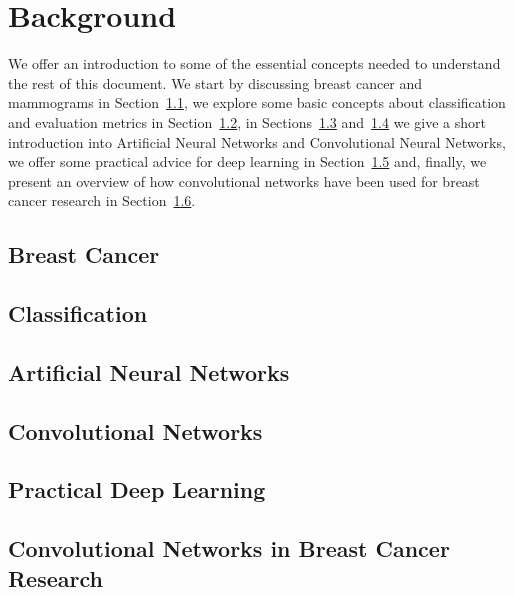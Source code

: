 \chapter{Background}
\label{ch:Background}
We offer an introduction to some of the essential concepts needed to understand the rest of this document. We start by discussing breast cancer and mammograms in Section~\ref{sec:BreastCancer}, we explore some basic concepts about classification and evaluation metrics in Section~\ref{sec:Classification}, in Sections~\ref{sec:ANNs} and~\ref{sec:ConvNets} we give a short introduction into Artificial Neural Networks and Convolutional Neural Networks, we offer some practical advice for deep learning in Section~\ref{sec:PracticalDL} and, finally, we present an overview of how convolutional networks have been used for breast cancer research in Section~\ref{sec:BreastCancerConvNets}.

\section{Breast Cancer}
\label{sec:BreastCancer}


\section{Classification}
\label{sec:Classification}


\section{Artificial Neural Networks}
\label{sec:ANNs}


\section{Convolutional Networks}
\label{sec:ConvNets}


\section{Practical Deep Learning}
\label{sec:PracticalDL}


\section{Convolutional Networks in Breast Cancer Research}
\label{sec:BreastCancerConvNets}

